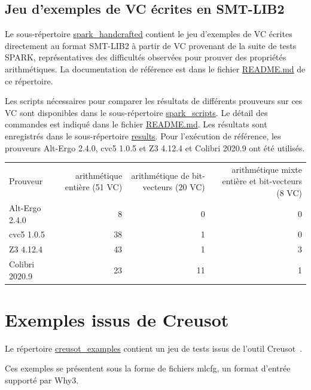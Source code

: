 \documentclass[a4paper,11pt]{article}
\begin{document}
\subsection{Jeu d'exemples de VC écrites en SMT-LIB2}

Le sous-répertoire \url{spark_handcrafted} contient le jeu d'exemples de VC
écrites directement au format SMT-LIB2 à partir de VC provenant de la suite de
tests SPARK, représentatives des difficultés observées pour prouver des
propriétés arithmétiques. La documentation de référence est dans le fichier
\url{README.md} de ce répertoire.

Les scripts nécessaires pour comparer les résultats de différents prouveurs sur
ces VC sont disponibles dans le sous-répertoire \url{spark_scripts}. Le détail
des commandes est indiqué dans le fichier \url{README.md}. Les résultats sont
enregistrés dans le sous-répertoire \url{results}.  Pour l'exécution de
référence, les prouveurs Alt-Ergo 2.4.0, cvc5 1.0.5 et Z3 4.12.4 et Colibri
2020.9 ont été utilisés.

\begin{center}
  \begin{tabular}{|l|r|r|r|}
    \hline
  \rowcolor{gray!50} Prouveur
  & \multicolumn{1}{p{0.13\textwidth}|}{arithmétique entière (51 VC)}
  & \multicolumn{1}{p{0.13\textwidth}|}{arithmétique de bit-vecteurs (20 VC)}
  & \multicolumn{1}{p{0.13\textwidth}|}{arithmétique mixte entière et bit-vecteurs (8 VC)}
  \\
  Alt-Ergo 2.4.0                &  8 &  0 & 0  \\
  cvc5 1.0.5                    & 38 &  1 & 0 \\
  Z3 4.12.4                     & 43 &  1 & 3 \\
    Colibri 2020.9                & 23 & 11 & 1 \\
    \hline
\end{tabular}
\end{center}

\section{Exemples issus de Creusot}

Le répertoire \url{creusot_examples} contient un jeu de tests issus de
l'outil Creusot~\cite{denis22icfem}.

Ces exemples se présentent sous la forme de fichiers mlcfg, un format d'entrée supporté par Why3.
\end{document}
